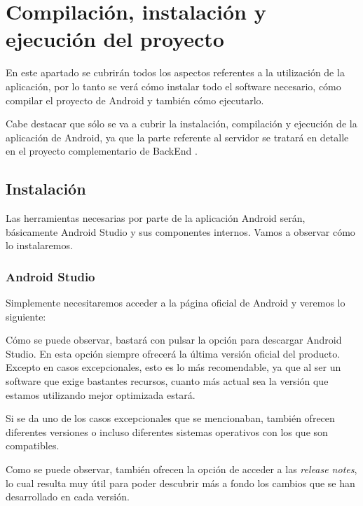 
\section{Compilación, instalación y ejecución del proyecto}

En este apartado se cubrirán todos los aspectos referentes a la utilización de la aplicación, por lo tanto se verá cómo instalar todo el software necesario, cómo compilar el proyecto de Android y también cómo ejecutarlo.

Cabe destacar que sólo se va a cubrir la instalación, compilación y ejecución de la aplicación de Android, ya que la parte referente al servidor se tratará en detalle en el proyecto complementario de BackEnd \cite{tfg2}.

\subsection{Instalación}

Las herramientas necesarias por parte de la aplicación Android serán, básicamente Android Studio y sus componentes internos. Vamos a observar cómo lo instalaremos.

\subsubsection{Android Studio}

Simplemente necesitaremos acceder a la página oficial de Android \cite{as1} y veremos lo siguiente:


Cómo se puede observar, bastará con pulsar la opción para descargar Android Studio. En esta opción siempre ofrecerá la última versión oficial del producto. Excepto en casos excepcionales, esto es lo más recomendable, ya que al ser un software que exige bastantes recursos, cuanto más actual sea la versión que estamos utilizando mejor optimizada estará. 

Si se da uno de los casos excepcionales que se mencionaban, también ofrecen diferentes versiones o incluso diferentes sistemas operativos con los que son compatibles.


Como se puede observar, también ofrecen la opción de acceder a las \textit{release notes}, lo cual resulta muy útil para poder descubrir más a fondo los cambios que se han desarrollado en cada versión.


